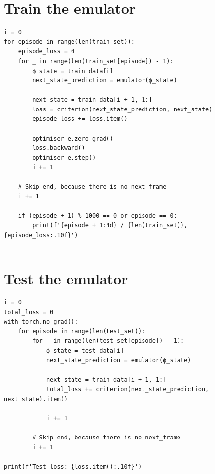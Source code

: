 \section{Train the emulator}
\begin{verbatim}
i = 0
for episode in range(len(train_set)):
    episode_loss = 0
    for _ in range(len(train_set[episode]) - 1):
        ϕ_state = train_data[i]
        next_state_prediction = emulator(ϕ_state)
        
        next_state = train_data[i + 1, 1:]
        loss = criterion(next_state_prediction, next_state)
        episode_loss += loss.item()
        
        optimiser_e.zero_grad()
        loss.backward()
        optimiser_e.step()
        i += 1
    
    # Skip end, because there is no next_frame
    i += 1
    
    if (episode + 1) % 1000 == 0 or episode == 0:
        print(f'{episode + 1:4d} / {len(train_set)}, {episode_loss:.10f}')


\end{verbatim}

\section{Test the emulator}
\begin{verbatim}
i = 0
total_loss = 0
with torch.no_grad():
    for episode in range(len(test_set)):
        for _ in range(len(test_set[episode]) - 1):
            ϕ_state = test_data[i]
            next_state_prediction = emulator(ϕ_state)

            next_state = train_data[i + 1, 1:]
            total_loss += criterion(next_state_prediction, next_state).item()

            i += 1

        # Skip end, because there is no next_frame
        i += 1
    
print(f'Test loss: {loss.item():.10f}')
\end{verbatim}
